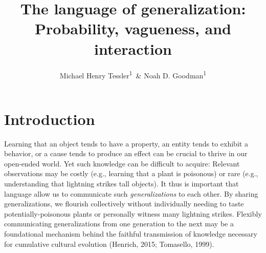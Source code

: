 \documentclass[english,floatsintext,man]{apa6}
\title{The language of generalization: Probability, vagueness, and interaction}
\author{Michael Henry Tessler\textsuperscript{1}~\& Noah D. Goodman\textsuperscript{1}}
\affiliation{
    \vspace{0.5cm}
          \textsuperscript{1} Department of Psychology, Stanford University  }
\theoremstyle{definition}
\theoremstyle{definition}
\theoremstyle{definition}
\theoremstyle{remark}
\begin{document}
\maketitle

\setcounter{secnumdepth}{0}



\newcommand{\denote}[1]{\mbox{ $[\![ #1 ]\!]$}}
\newcommand*\diff{\mathop{}\!\mathrm{d}}

 

\newcommand{\mht}[1]{{\textcolor{Blue}{[mht: #1]}}}
\newcommand{\ndg}[1]{{\textcolor{Green}{[ndg: #1]}}}
\newcommand{\red}[1]{{\textcolor{Red}{#1}}}






\section{Introduction}\label{introduction}

Learning that an object tends to have a property, an entity tends to
exhibit a behavior, or a cause tends to produce an effect can be crucial
to thrive in our open-ended world. Yet such knowledge can be difficult
to acquire: Relevant observations may be costly (e.g., learning that a
plant is poisonous) or rare (e.g., understanding that lightning strikes
tall objects). It thus is important that language allow us to
communicate such \emph{generalizations} to each other. By sharing
generalizations, we flourish collectively without individually needing
to taste potentially-poisonous plants or personally witness many
lightning strikes. Flexibly communicating generalizations from one
generation to the next may be a foundational mechanism behind the
faithful transmission of knowledge necessary for cumulative cultural
evolution (Henrich, 2015; Tomasello, 1999).
\end{document}
